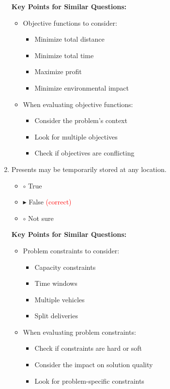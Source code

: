 \begin{enumerate}[label=\alph*)]
\textbf{Key Points for Similar Questions:}
\begin{itemize}
\item Objective functions to consider:
  \begin{itemize}
  \item Minimize total distance
  \item Minimize total time
  \item Maximize profit
  \item Minimize environmental impact
  \end{itemize}
\item When evaluating objective functions:
  \begin{itemize}
  \item Consider the problem's context
  \item Look for multiple objectives
  \item Check if objectives are conflicting
  \end{itemize}
\end{itemize}

\item Presents may be temporarily stored at any location.
\begin{itemize}
\item $\circ$ True
\item $\blacktriangleright$ False \hspace{1em} \textcolor{red}{(correct)}
\item $\circ$ Not sure
\end{itemize}

\textbf{Key Points for Similar Questions:}
\begin{itemize}
\item Problem constraints to consider:
  \begin{itemize}
  \item Capacity constraints
  \item Time windows
  \item Multiple vehicles
  \item Split deliveries
  \end{itemize}
\item When evaluating problem constraints:
  \begin{itemize}
  \item Check if constraints are hard or soft
  \item Consider the impact on solution quality
  \item Look for problem-specific constraints
  \end{itemize}
\end{itemize}


\end{enumerate}
